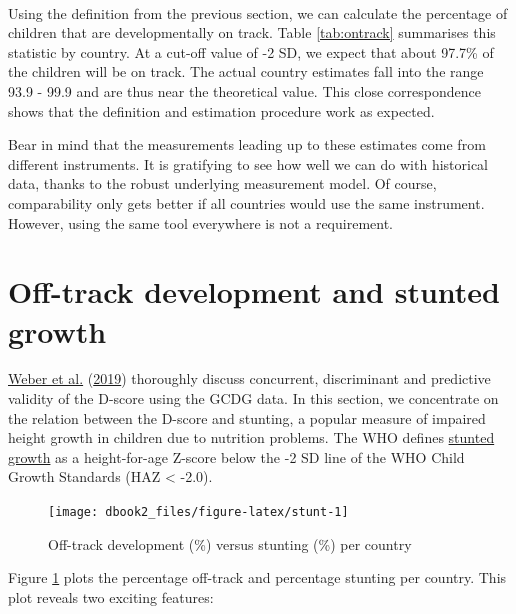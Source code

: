 \documentclass[
]{book}
\begin{document}
~

Using the definition from the previous section, we can calculate the percentage of children that are developmentally on track. Table \ref{tab:ontrack} summarises this statistic by country. At a cut-off value of -2 SD, we expect that about 97.7\% of the children will be on track. The actual country estimates fall into the range 93.9 - 99.9 and are thus near the theoretical value. This close correspondence shows that the definition and estimation procedure work as expected.

Bear in mind that the measurements leading up to these estimates come from different instruments. It is gratifying to see how well we can do with historical data, thanks to the robust underlying measurement model. Of course, comparability only gets better if all countries would use the same instrument. However, using the same tool everywhere is not a requirement.

\hypertarget{sec:otherestimates}{%
\section{Off-track development and stunted growth}\label{sec:otherestimates}}

\protect\hyperlink{ref-Weber2019}{Weber et al.} (\protect\hyperlink{ref-Weber2019}{2019}) thoroughly discuss concurrent, discriminant and predictive validity of the D-score using the GCDG data. In this section, we concentrate on the relation between the D-score and stunting, a popular measure of impaired height growth in children due to nutrition problems. The WHO defines \href{https://www.who.int/nutrition/healthygrowthproj/en/index1.html}{stunted growth} as a height-for-age Z-score below the -2 SD line of the WHO Child Growth Standards (HAZ \textless{} -2.0).

\begin{figure}

{\centering \texttt{[image: dbook2\_files/figure-latex/stunt-1]} 

}

\caption{Off-track development (\%) versus stunting (\%) per country}\label{fig:stunt}
\end{figure}



Figure \ref{fig:stunt} plots the percentage off-track and percentage stunting per country. This plot reveals two exciting features:
\end{document}
